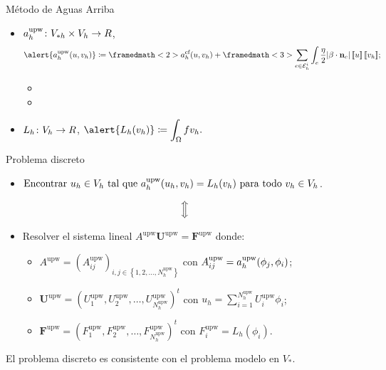 	\begin{frame}{Método de Aguas Arriba}
	
	\begin{itemize}\itemsep1em
		\item $a_h^{\text{upw}}\colon V_{*h}\times V_h\to \relax R$, $$\alert{\aupw{u}{v_h}}\coloneqq \framedmath<2>{\displaystyle \acf{u}{v_h}}+\framedmath<3>{\displaystyle \sum_{e\in\E_h^i}\int_e\frac{\eta}{2}|\beta\cdot\mathbf{n}_e|\salto{u}\salto{v_h}};$$
		\begin{itemize}
			\item<2> 
			\item<3> 
		\end{itemize}
		\item $L_h\colon V_h\to\relax R$, $\displaystyle \alert{L_h(v_h)}\coloneqq\int_\Omega f v_h.$
	\end{itemize}
	\end{frame}
	
	\begin{frame}{Problema discreto}
	
	\begin{itemize}
		\item $\text{Encontrar }u_h\in V_h\text{ tal que }a_h^{\text{upw}}(u_h,v_h)=L_h(v_h)\text{ para todo }v_h\in V_h$.
	\end{itemize}
	\vspace*{0.1cm}
	$$\Big{\Updownarrow}$$
	\vspace*{-0.3cm}
	\begin{itemize}
		\item Resolver el sistema lineal $A^{\text{upw}}\mathbf{U}^{\text{upw}}=\mathbf{F}^{\text{upw}}$ donde:
		\vspace*{0.3cm}
		\begin{itemize}
			\item $A^{\text{upw}}=\left(A_{ij}^{\text{upw}}\right)_{i,j\in\left\{1,2,\ldots,N_h^{\text{upw}}\right\}}$ con $A_{ij}^{\text{upw}}=a_h^{\text{upw}}(\phi_j,\phi_i)$;
			\item $\mathbf{U}^{\text{upw}}=\left(U_1^{\text{upw}},U_2^{\text{upw}},\ldots,U_{N_h^{\text{upw}}}^{\text{upw}}\right)^t$ con $u_h=\displaystyle\sum_{i=1}^{N_h^{\text{upw}}}U_i^{\text{upw}}\phi_i$;
			\item $\mathbf{F}^{\text{upw}}=\left(F_1^{\text{upw}},F_2^{\text{upw}},\ldots,F_{N_h^{\text{upw}}}^{\text{upw}}\right)^t$ con $F_i^{\text{upw}}=L_h(\phi_i)$.
		\end{itemize}
	\end{itemize}
	
	\vspace*{0.3cm}
	El problema discreto es consistente con el problema modelo en $V_*$.
	
	\end{frame}
	
